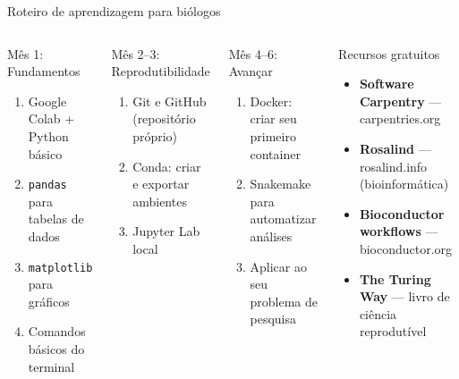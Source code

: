 \begin{frame}[shrink=15]{Roteiro de aprendizagem para biólogos}
\begin{columns}
\begin{block}{Mês 1: Fundamentos}
\begin{enumerate}
    \item Google Colab + Python básico
    \item \texttt{pandas} para tabelas de dados
    \item \texttt{matplotlib} para gráficos
    \item Comandos básicos do terminal
\end{enumerate}
\end{block}
\vspace{0.4cm}
\begin{block}{Mês 2--3: Reprodutibilidade}
\begin{enumerate}
    \item Git e GitHub (repositório próprio)
    \item Conda: criar e exportar ambientes
    \item Jupyter Lab local
\end{enumerate}
\end{block}

\begin{block}{Mês 4--6: Avançar}
\begin{enumerate}
    \item Docker: criar seu primeiro container
    \item Snakemake para automatizar análises
    \item Aplicar ao seu problema de pesquisa
\end{enumerate}
\end{block}
\vspace{0.4cm}
\begin{exampleblock}{Recursos gratuitos}
\begin{itemize}
    \item \textbf{Software Carpentry} — carpentries.org
    \item \textbf{Rosalind} — rosalind.info (bioinformática)
    \item \textbf{Bioconductor workflows} — bioconductor.org
    \item \textbf{The Turing Way} — livro de ciência reprodutível
\end{itemize}
\end{exampleblock}
\end{columns}
\end{frame}

